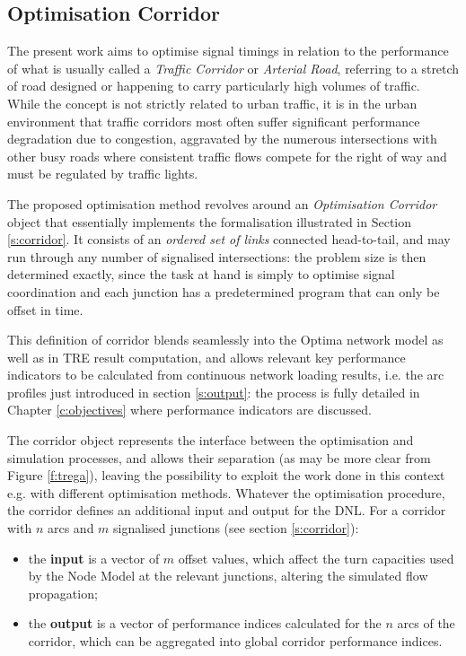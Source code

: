 \subsection{Optimisation Corridor}
The present work aims to optimise signal timings in relation to the performance of what is usually called a \emph{Traffic Corridor} or \emph{Arterial Road}, referring to a stretch of road designed or happening to carry particularly high volumes of traffic. \\
While the concept is not strictly related to urban traffic, it is in the urban environment that traffic corridors most often suffer significant performance degradation due to congestion, aggravated by the numerous intersections with other busy roads where consistent traffic flows compete for the right of way and must be regulated by traffic lights.

The proposed optimisation method revolves around an \emph{Optimisation Corridor} object that essentially implements the formalisation illustrated in Section \ref{s:corridor}. It consists of an \emph{ordered set of links} connected head-to-tail, and may run through any number of signalised intersections: the problem size is then determined exactly, since the task at hand is simply to optimise signal coordination and each junction has a predetermined program that can only be offset in time.

This definition of corridor blends seamlessly into the Optima network model as well as in TRE result computation, and allows relevant key performance indicators to be calculated from continuous network loading results, i.e. the arc profiles just introduced in section \ref{s:output}: the process is fully detailed in Chapter \ref{c:objectives} where performance indicators are discussed.

The corridor object represents the interface between the optimisation and simulation processes, and allows their separation (as may be more clear from Figure \ref{f:trega}), leaving the possibility to exploit the work done in this context e.g. with different optimisation methods. Whatever the optimisation procedure, the corridor defines an additional input and output for the DNL. For a corridor with $n$ arcs and $m$ signalised junctions (see section \ref{s:corridor}):
\begin{itemize}
\item the \textbf{input} is a vector of $m$ offset values, which affect the turn capacities used by the Node Model at the relevant junctions, altering the simulated flow propagation;
\item the \textbf{output} is a vector of performance indices calculated for the $n$ arcs of the corridor, which can be aggregated into global corridor performance indices.
\end{itemize}

